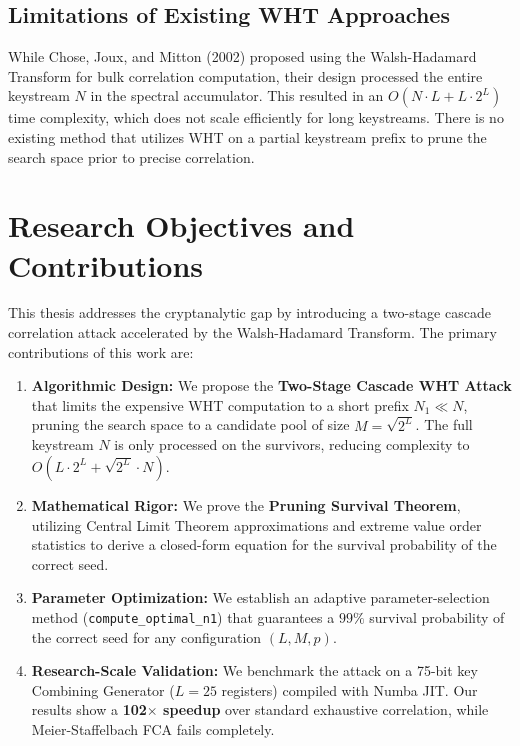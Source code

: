\subsection{Limitations of Existing WHT Approaches}
While Chose, Joux, and Mitton (2002) proposed using the Walsh-Hadamard Transform for bulk correlation computation, their design processed the entire keystream $N$ in the spectral accumulator. This resulted in an $O(N \cdot L + L \cdot 2^L)$ time complexity, which does not scale efficiently for long keystreams. There is no existing method that utilizes WHT on a partial keystream prefix to prune the search space prior to precise correlation.

\section{Research Objectives and Contributions}
\label{sec:objectives}
This thesis addresses the cryptanalytic gap by introducing a two-stage cascade correlation attack accelerated by the Walsh-Hadamard Transform. The primary contributions of this work are:
\begin{enumerate}
    \item \textbf{Algorithmic Design:} We propose the \textbf{Two-Stage Cascade WHT Attack} that limits the expensive WHT computation to a short prefix $N_1 \ll N$, pruning the search space to a candidate pool of size $M = \sqrt{2^L}$. The full keystream $N$ is only processed on the survivors, reducing complexity to $O(L \cdot 2^L + \sqrt{2^L} \cdot N)$.
    \item \textbf{Mathematical Rigor:} We prove the \textbf{Pruning Survival Theorem}, utilizing Central Limit Theorem approximations and extreme value order statistics to derive a closed-form equation for the survival probability of the correct seed.
    \item \textbf{Parameter Optimization:} We establish an adaptive parameter-selection method (\texttt{compute\_optimal\_n1}) that guarantees a $99\%$ survival probability of the correct seed for any configuration $(L, M, p)$.
    \item \textbf{Research-Scale Validation:} We benchmark the attack on a 75-bit key Combining Generator ($L = 25$ registers) compiled with Numba JIT. Our results show a \textbf{102$\times$ speedup} over standard exhaustive correlation, while Meier-Staffelbach FCA fails completely.
\end{enumerate}

